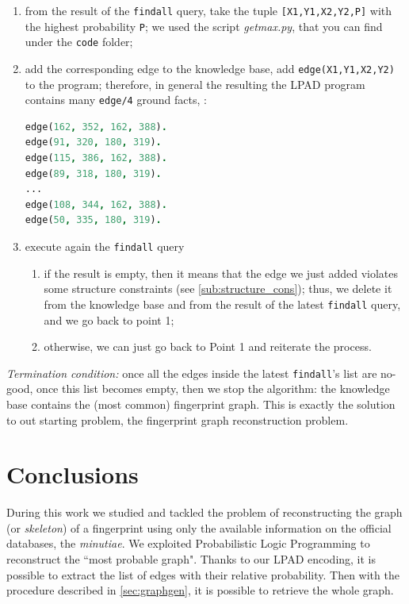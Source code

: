\documentclass[8pt]{article}
\begin{document}
  \begin{enumerate}
    \item
      from the result of the \texttt{findall} query, take the tuple
      \texttt{[X1,Y1,X2,Y2,P]} with the highest probability \texttt{P};
      we used the script \emph{getmax.py}, that you can find under the
      \texttt{code} folder;
    \item
      add the corresponding edge to the knowledge base, \ie add
      \texttt{edge(X1,Y1,X2,Y2)} to the program; therefore, in general the
      resulting the LPAD program contains many \texttt{edge/4} ground facts,
      \eg:
  \begin{center}
  \begin{lstlisting}[language=Prolog,frame = single,basicstyle=\footnotesize\ttfamily]
edge(162, 352, 162, 388).
edge(91, 320, 180, 319).
edge(115, 386, 162, 388).
edge(89, 318, 180, 319).
...
edge(108, 344, 162, 388).
edge(50, 335, 180, 319).
  \end{lstlisting}
  \end{center}

    \item
      execute again the \texttt{findall} query
      \begin{enumerate}
        \item
          if the result is empty, then it means that the edge we just
          added violates some structure constraints (see
          \cref{sub:structure_cons}); thus, we delete it from the knowledge
          base and from the result of the latest \texttt{findall} query, and we
          go back to point 1; 
        \item
          otherwise, we can just go back to Point 1 and reiterate the process.
      \end{enumerate}
  \end{enumerate}
\emph{Termination condition:} once all the edges inside the latest
\texttt{findall}'s list are no-good, \ie once this list becomes empty, then we
stop the algorithm: the knowledge base contains the (most common) fingerprint
graph. This is exactly the solution to out starting problem, \ie the
fingerprint graph reconstruction problem.





\section{Conclusions}
During this work we studied and tackled the problem of reconstructing the graph
(or \emph{skeleton}) of a fingerprint using only the available information on
the official databases, \ie the \emph{minutiae}.  We exploited Probabilistic
Logic Programming to reconstruct the \textquotedblleft most probable graph".
Thanks to our LPAD encoding, it is possible to extract the list of edges with
their relative probability.  Then with the procedure described in
\cref{sec:graphgen}, it is possible to retrieve the whole graph.
\end{document}
